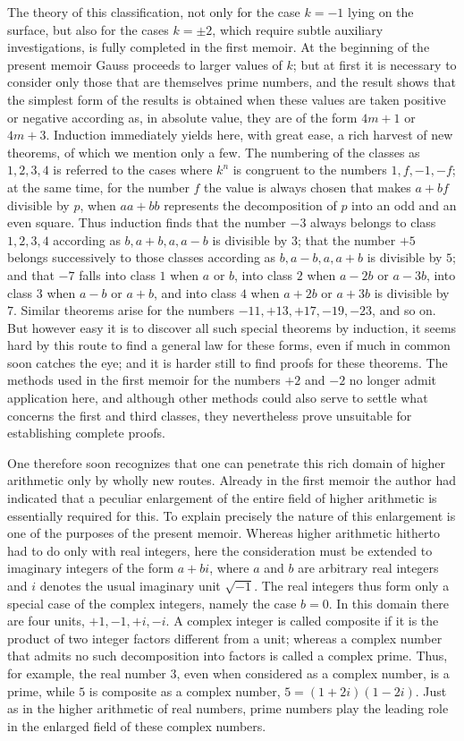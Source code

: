 \documentclass[12pt]{article}
\begin{document}
The theory of this classification, not only for the case $k=-1$ lying on the surface, but also for the cases $k=\pm2$, which require subtle auxiliary investigations, is fully completed in the first memoir. At the beginning of the present memoir Gauss proceeds to larger values of $k$; but at first it is necessary to consider only those that are themselves prime numbers, and the result shows that the simplest form of the results is obtained when these values are taken positive or negative according as, in absolute value, they are of the form $4m+1$ or $4m+3$. Induction immediately yields here, with great ease, a rich harvest of new theorems, of which we mention only a few. The numbering of the classes as $1,2,3,4$ is referred to the cases where $k^n$ is congruent to the numbers $1,f,-1,-f$; at the same time, for the number $f$ the value is always chosen that makes $a+bf$ divisible by $p$, when $aa+bb$ represents the decomposition of $p$ into an odd and an even square. Thus induction finds that the number $-3$ always belongs to class $1,2,3,4$ according as $b,a+b,a,a-b$ is divisible by $3$; that the number $+5$ belongs successively to those classes according as $b,a-b,a,a+b$ is divisible by $5$; and that $-7$ falls into class $1$ when $a$ or $b$, into class $2$ when $a-2b$ or $a-3b$, into class $3$ when $a-b$ or $a+b$, and into class $4$ when $a+2b$ or $a+3b$ is divisible by $7$. Similar theorems arise for the numbers $-11,+13,+17,-19,-23$, and so on. But however easy it is to discover all such special theorems by induction, it seems hard by this route to find a general law for these forms, even if much in common soon catches the eye; and it is harder still to find proofs for these theorems. The methods used in the first memoir for the numbers $+2$ and $-2$ no longer admit application here, and although other methods could also serve to settle what concerns the first and third classes, they nevertheless prove unsuitable for establishing complete proofs.

One therefore soon recognizes that one can penetrate this rich domain of higher arithmetic only by wholly new routes. Already in the first memoir the author had indicated that a peculiar enlargement of the entire field of higher arithmetic is essentially required for this. To explain precisely the nature of this enlargement is one of the purposes of the present memoir. Whereas higher arithmetic hitherto had to do only with real integers, here the consideration must be extended to imaginary integers of the form $a+bi$, where $a$ and $b$ are arbitrary real integers and $i$ denotes the usual imaginary unit $\sqrt{-1}$. The real integers thus form only a special case of the complex integers, namely the case $b=0$. In this domain there are four units, $+1,-1,+i,-i$. A complex integer is called composite if it is the product of two integer factors different from a unit; whereas a complex number that admits no such decomposition into factors is called a complex prime. Thus, for example, the real number $3$, even when considered as a complex number, is a prime, while $5$ is composite as a complex number, $5=(1+2i)(1-2i)$. Just as in the higher arithmetic of real numbers, prime numbers play the leading role in the enlarged field of these complex numbers.
\end{document}
